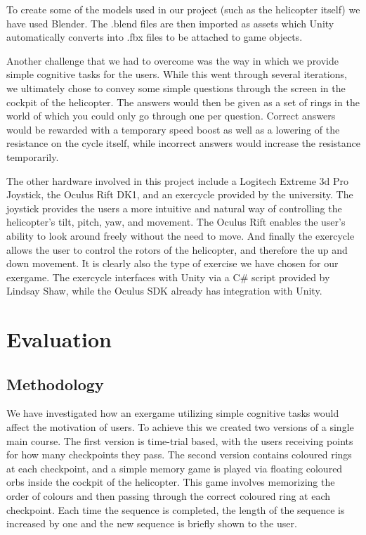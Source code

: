 \documentclass[11pt, 
]{IEEEtran}
\begin{document}
To create some of the models used in our project (such as the helicopter itself) we have used Blender. The .blend files are then imported as assets which Unity automatically converts into .fbx files to be attached to game objects.

Another challenge that we had to overcome was the way in which we provide simple cognitive tasks for the users. While this went through several iterations, we ultimately chose to convey some simple questions through the screen in the cockpit of the helicopter. The answers would then be given as a set of rings in the world of which you could only go through one per question. Correct answers would be rewarded with a temporary speed boost as well as a lowering of the resistance on the cycle itself, while incorrect answers would increase the resistance temporarily.

The other hardware involved in this project include a Logitech Extreme 3d Pro Joystick, the Oculus Rift DK1, and an exercycle provided by the university. The joystick provides the users a more intuitive and natural way of controlling the helicopter's tilt, pitch, yaw, and movement. The Oculus Rift enables the user's ability to look around freely without the need to move. And finally the exercycle allows the user to control the rotors of the helicopter, and therefore the up and down movement. It is clearly also the type of exercise we have chosen for our exergame. The exercycle interfaces with Unity via a C\# script provided by Lindsay Shaw, while the Oculus SDK already has integration with Unity.

\section{Evaluation}

\subsection{Methodology}

We have investigated how an exergame utilizing simple cognitive tasks would affect the motivation of users. To achieve this we created two versions of a single main course. The first version is time-trial based, with the users receiving points for how many checkpoints they pass. The second version contains coloured rings at each checkpoint, and a simple memory game is played via floating coloured orbs inside the cockpit of the helicopter. This game involves memorizing the order of colours and then passing through the correct coloured ring at each checkpoint. Each time the sequence is completed, the length of the sequence is increased by one and the new sequence is briefly shown to the user.
\end{document}
